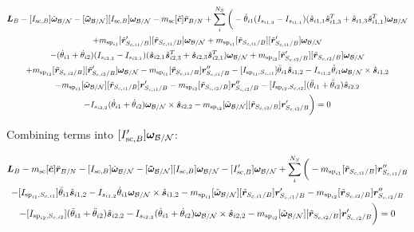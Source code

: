 \documentclass[paper]{aiaaNew}
\begin{document}
\begin{multline}
\bm L_B -[I_{\text{sc},B}] \dot{\bm\omega}_{\cal B/N} -[\bm{\tilde{\omega}}_{\cal B/N}] [I_{\text{sc},B}] \bm\omega_{\cal B/N} 
- m_{\text{sc}} [\tilde{\bm c}] \ddot{\bm r}_{B/N} 
+ \sum\limits_{i}^{N_S}\bigg( -\dot{\theta}_{i1} (I_{s_{i1,3}} - I_{s_{i1,1}})( \hat{\bm s}_{i1,1} \hat{\bm s}_{i1,3}^T + \hat{\bm s}_{i1,3} \hat{\bm s}_{i1,1}^T) \bm \omega_{\cal{B/N}} \\
+ m_{\text{sp}_{i1}} [\tilde{{\bm r}}'_{S_{c,i1}/B}] [\tilde{{\bm r}}_{S_{c,i1}/B}] \bm\omega_{\cal B/N} + m_{\text{sp}_{i1}} [\tilde{{\bm r}}_{S_{c,i1}/B}] [\tilde{{\bm r}}'_{S_{c,i1}/B}] \bm\omega_{\cal B/N} \\
-(\dot{\theta}_{i1}  + \dot{\theta}_{i2})(I_{s_{i2,3}} - I_{s_{i2,1}}) (\hat{\bm s}_{i2,1} \hat{\bm s}_{i2,3}^T + \hat{\bm s}_{i2,3} \hat{\bm s}_{i2,1}^T) \bm \omega_{\cal{B/N}} 
+ m_{\text{sp}_{i2}} [\tilde{{\bm r}}'_{S_{c,i2}/B}] [\tilde{{\bm r}}_{S_{c,i2}/B}] \bm\omega_{\cal B/N} \\
+  m_{\text{sp}_{i2}} [\tilde{{\bm r}}_{S_{c,i2}/B}] [\tilde{{\bm r}}'_{S_{c,i2}/B}] \bm\omega_{\cal B/N}
- m_{\text{sp}_{i1}} [\tilde{{\bm r}}_{S_{c,i1}/B}] \bm{r}''_{S_{c,i1}/B} 
-[I_{\text{sp}_{i1},S_{c,i1}}] \ddot{\theta}_{i1} \hat{\bm s}_{i1,2} 
-I_{s_{i1,2}} \dot{\theta}_{i1} \bm \omega_{\cal{B/N}} \times \hat{\bm s}_{i1,2} \\
- m_{\text{sp}_{i1}} [\tilde{\bm\omega}_{\cal B/N}] [\tilde{{\bm r}}_{S_{c,i1}/B}] \bm{r}'_{S_{c,i1}/B}
- m_{\text{sp}_{i2}} [\tilde{{\bm r}}_{S_{c,i2}/B}] \bm{r}''_{S_{c,i2}/B}
-[I_{\text{sp}_{i2},S_{c,i2}}] (\ddot{\theta}_{i1}  + \ddot{\theta}_{i2})\hat{\bm s}_{i2,2} 
\\
-I_{s_{i2,2}}  (\dot{\theta}_{i1}  + \dot{\theta}_{i2}) \bm \omega_{\cal{B/N}} \times \hat{\bm s}_{i2,2} 
- m_{\text{sp}_{i2}} [\tilde{\bm\omega}_{\cal B/N}] [\tilde{{\bm r}}_{S_{c,i2}/B}] \bm{r}'_{S_{c,i2}/B} \bigg) = 0
\end{multline}

Combining terms into $[I'_{\text{sc},B}] \bm\omega_{\cal B/N}$:

\begin{multline}
\bm L_B - m_{\text{sc}} [\tilde{\bm c}] \ddot{\bm r}_{B/N} -[I_{\text{sc},B}] \dot{\bm\omega}_{\cal B/N} -[\bm{\tilde{\omega}}_{\cal B/N}] [I_{\text{sc},B}] \bm\omega_{\cal B/N} - [I'_{\text{sc},B}] \bm\omega_{\cal B/N}
+ \sum\limits_{i}^{N_S}\bigg(
- m_{\text{sp}_{i1}} [\tilde{{\bm r}}_{S_{c,i1}/B}] \bm{r}''_{S_{c,i1}/B} 
\\
-[I_{\text{sp}_{i1},S_{c,i1}}] \ddot{\theta}_{i1} \hat{\bm s}_{i1,2} 
-I_{s_{i1,2}} \dot{\theta}_{i1} \bm \omega_{\cal{B/N}} \times \hat{\bm s}_{i1,2} - m_{\text{sp}_{i1}} [\tilde{\bm\omega}_{\cal B/N}] [\tilde{{\bm r}}_{S_{c,i1}/B}] \bm{r}'_{S_{c,i1}/B}
- m_{\text{sp}_{i2}} [\tilde{{\bm r}}_{S_{c,i2}/B}] \bm{r}''_{S_{c,i2}/B}\\
-[I_{\text{sp}_{i2},S_{c,i2}}] (\ddot{\theta}_{i1}  + \ddot{\theta}_{i2})\hat{\bm s}_{i2,2} 
-I_{s_{i2,2}}  (\dot{\theta}_{i1}  + \dot{\theta}_{i2}) \bm \omega_{\cal{B/N}} \times \hat{\bm s}_{i2,2} - m_{\text{sp}_{i2}} [\tilde{\bm\omega}_{\cal B/N}] [\tilde{{\bm r}}_{S_{c,i2}/B}] \bm{r}'_{S_{c,i2}/B} \bigg) = 0
\end{multline}
\end{document}
